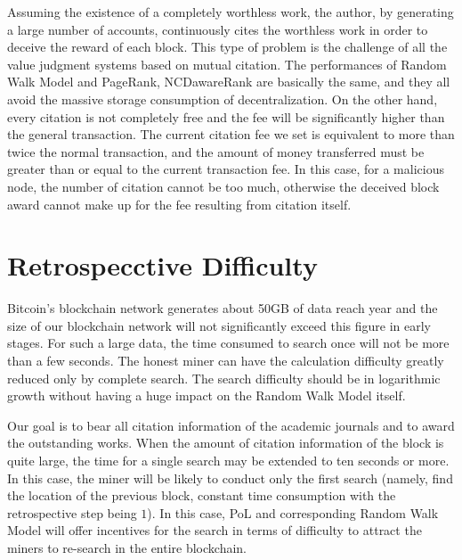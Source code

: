 \documentclass[a4paper,oneside,openany]{tufte-book}
\begin{document}
Assuming the existence of a completely worthless work, the author, by generating a large number of accounts, continuously cites the worthless work in order to deceive the reward of each block. This type of problem is the challenge of all the value judgment systems based on mutual citation. The performances of Random Walk Model and PageRank, NCDawareRank are basically the same, and they all avoid the massive storage consumption of decentralization. On the other hand, every citation is not completely free and the fee will be significantly higher than the general transaction. The current citation fee we set is equivalent to more than twice the normal transaction, and the amount of money transferred must be greater than or equal to the current transaction fee. In this case, for a malicious node, the number of citation cannot be too much, otherwise the deceived block award cannot make up for the fee resulting from citation itself.




\section{Retrospecctive Difficulty}

Bitcoin’s blockchain network generates about 50GB of data reach year and the size of our blockchain network will not significantly exceed this figure in early stages. For such a large data, the time consumed to search once will not be more than a few seconds. The honest miner can have the calculation difficulty greatly reduced only by complete search. The search difficulty should be in logarithmic growth without having a huge impact on the Random Walk Model itself.



Our goal is to bear all citation information of the academic journals and to award the outstanding works. When the amount of citation information of the block is quite large, the time for a single search may be extended to ten seconds or more. In this case, the miner will be likely to conduct only the first search (namely, find the location of the previous block, constant time consumption with the retrospective step being $1$). In this case, PoL and corresponding Random Walk Model will offer incentives for the search in terms of difficulty to attract the miners to re-search in the entire blockchain.
\end{document}
